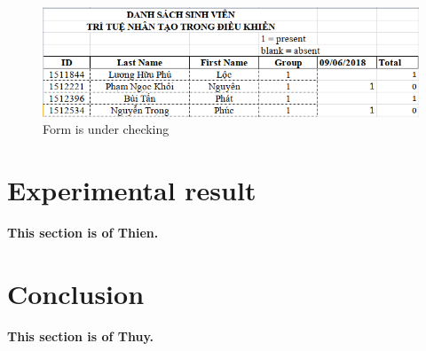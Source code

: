 \documentclass[journal, twocolumn]{IEEEtran}
\begin{document}
\begin{figure}
    \centering
    \includegraphics[width=0.8\linewidth]{img/form-checked.png}
	\caption{Form is under checking}\label{fig:form-checked}
\end{figure}


\medskip
\section{Experimental result}
\label{experimental-result}
\textbf{This section is of Thien.}


\medskip
\section{Conclusion}
\label{conclusion}
\textbf{This section is of Thuy.}


\begin{thebibliography}{9}

\end{thebibliography}
\end{document}
